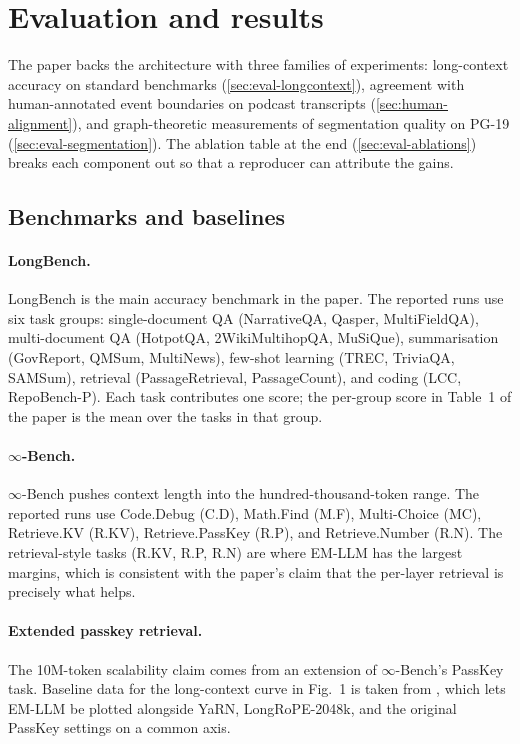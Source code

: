 \section{Evaluation and results}
\label{sec:evaluation}

The paper backs the architecture with three families of experiments: long-context accuracy on standard benchmarks (\cref{sec:eval-longcontext}), agreement with human-annotated event boundaries on podcast transcripts (\cref{sec:human-alignment}), and graph-theoretic measurements of segmentation quality on PG-19 (\cref{sec:eval-segmentation}). The ablation table at the end (\cref{sec:eval-ablations}) breaks each component out so that a reproducer can attribute the gains.

\subsection{Benchmarks and baselines}
\label{sec:eval-benchmarks}

\paragraph{LongBench.}
LongBench \cite{bai2023longbench} is the main accuracy benchmark in the paper. The reported runs use six task groups: single-document QA (NarrativeQA, Qasper, MultiFieldQA), multi-document QA (HotpotQA, 2WikiMultihopQA, MuSiQue), summarisation (GovReport, QMSum, MultiNews), few-shot learning (TREC, TriviaQA, SAMSum), retrieval (PassageRetrieval, PassageCount), and coding (LCC, RepoBench-P). Each task contributes one score; the per-group score in Table~1 of the paper is the mean over the tasks in that group.

\paragraph{$\infty$-Bench.}
$\infty$-Bench \cite{zhang2024infbench} pushes context length into the hundred-thousand-token range. The reported runs use Code.Debug (C.D), Math.Find (M.F), Multi-Choice (MC), Retrieve.KV (R.KV), Retrieve.PassKey (R.P), and Retrieve.Number (R.N). The retrieval-style tasks (R.KV, R.P, R.N) are where EM-LLM has the largest margins, which is consistent with the paper's claim that the per-layer retrieval is precisely what helps.

\paragraph{Extended passkey retrieval.}
The 10M-token scalability claim comes from an extension of $\infty$-Bench's PassKey task. Baseline data for the long-context curve in Fig.~1 is taken from \textcite{ding2024longrope}, which lets EM-LLM be plotted alongside YaRN, LongRoPE-2048k, and the original PassKey settings on a common axis.

